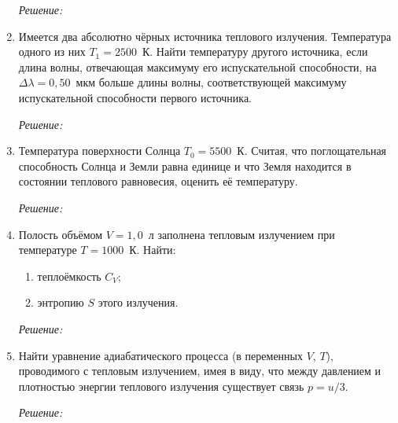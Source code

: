 \begin{enumerate}
\emph{Решение:}

\newpage

\item Имеется два абсолютно чёрных источника теплового излучения. Температура
одного из них \( T_1 = 2500 \)~К. Найти температуру другого источника, если
длина волны, отвечающая максимуму его испускательной способности, на
\( \Delta\lambda = 0,\!50 \)~мкм больше длины волны, соответствующей максимуму
испускательной способности первого источника.

\emph{Решение:}

\newpage

\item Температура поверхности Солнца \( T_0 = 5500 \)~К. Считая, что
поглощательная способность Солнца и Земли равна единице и что Земля находится в
состоянии теплового равновесия, оценить её температуру.

\emph{Решение:}

\newpage

\item Полость объёмом \( V = 1,\!0 \)~л заполнена тепловым излучением при
температуре \( T = 1000 \)~К. Найти:
\begin{enumerate}
    \item теплоёмкость \( C_V \);
    \item энтропию \( S \) этого излучения.
\end{enumerate}

\emph{Решение:}

\newpage

\item Найти уравнение адиабатического процесса (в переменных \( V \), \( T \)),
проводимого с тепловым излучением, имея в виду, что между давлением и плотностью
энергии теплового излучения существует связь \( p = u/3 \).

\emph{Решение:}

\end{enumerate}
